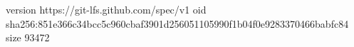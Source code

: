 version https://git-lfs.github.com/spec/v1
oid sha256:851e366c34bcc5c960cbaf3901d256051105990f1b04f0e9283370466babfc84
size 93472
